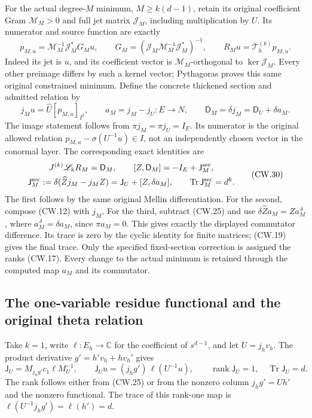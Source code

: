 For the actual degree-\(M\) minimum, \(M\ge k(d-1)\), retain
its original coefficient Gram \(\mathcal M_M>0\) and full
jet matrix \(\mathcal J_M\), including multiplication by \(U\).
Its numerator and source function are exactly
\[
 p_{M,u}=\mathcal M_M^{-1}\mathcal J_M^*G_Mu,\qquad
 G_M=(\mathcal J_M\mathcal M_M^{-1}\mathcal J_M^*)^{-1},
 \qquad R_Mu=\mathcal T_h^{(k)}p_{M,u}.
 \tag{CW.28}
\]
Indeed its jet is \(u\), and its coefficient vector is
\(\mathcal M_M\)-orthogonal to \(\ker\mathcal J_M\).
Every other preimage differs by such a kernel vector;
Pythagoras proves this same original constrained minimum.
Define the concrete thickened section and admitted relation by
\[
 j_Mu=\widehat U[p_{M,u}]_{I^2},\qquad
 a_M=j_M-j_U:E\to N,\qquad
 \mathsf D_M=\delta j_M=\mathsf D_U+\delta a_M.
 \tag{CW.29}
\]
The image statement follows from \(\pi j_M=\pi j_U=I_E\).
Its numerator is the original allowed relation
\(p_{M,u}-\sigma(U^{-1}u)\in I\), not an independently
chosen vector in the conormal layer.
The corresponding exact identities are
\[
 \begin{gathered}
 J^{(k)}\mathscr L_kR_M=\mathsf D_M,\qquad
 [Z,\mathsf D_M]=-I_E+\mathsf J_M^{\rm sec},\\
 \mathsf J_M^{\rm sec}
   :=\delta(\widehat Zj_M-j_MZ)
    =\mathsf J_U+[Z,\delta a_M],\qquad
 \operatorname{Tr}\mathsf J_M^{\rm sec}=d^k .
 \end{gathered}                                                    \tag{CW.30}
\]
The first follows by the same original Mellin differentiation.
For the second, compose (CW.12) with \(j_M\).
For the third, subtract (CW.25) and use
\(\delta\widehat Za_M=Za_M^{\,\delta}\), where
\(a_M^{\,\delta}=\delta a_M\), since \(\pi a_M=0\).
This gives exactly the displayed commutator difference.
Its trace is zero by the cyclic identity for finite matrices;
(CW.19) gives the final trace.
Only the specified fixed-section correction is assigned the
ranks (CW.17).  Every change to the actual minimum is retained
through the computed map \(a_M\) and its commutator.

\subsection{The one-variable residue functional and the original theta relation}

Take \(k=1\), write \(\ell:E_h\to\mathbb C\) for the
coefficient of \(s^{d-1}\), and let \(U=j_hv_h\).
The product derivative \(g'=h'v_h+hv_h'\) gives
\[
 \mathsf J_U
   =M_{j_hg'}c_1\ell M_U^{-1},\qquad
 \mathsf J_Uu=(j_hg')\,\ell(U^{-1}u),\qquad
 \operatorname{rank}\mathsf J_U=1,\quad
 \operatorname{Tr}\mathsf J_U=d .
 \tag{CW.31}
\]
The rank follows either from (CW.25) or from the nonzero
column \(j_hg'=Uh'\) and the nonzero functional.
The trace of this rank-one map is
\(\ell(U^{-1}j_hg')=\ell(h')=d\).

